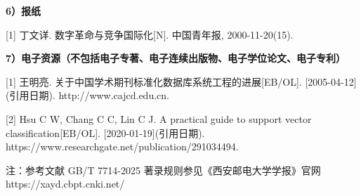 {\bfseries 6）报纸}\par
{[1]} 丁文详. 数字革命与竞争国际化[N]. 中国青年报, 2000-11-20(15).\par

{\bfseries 7）电子资源（不包括电子专著、电子连续出版物、电子学位论文、电子专利）}\par
{[1]} 王明亮. 关于中国学术期刊标准化数据库系统工程的进展[EB/OL]. [2005-04-12](引用日期). http://www.cajcd.edu.cn.\par
{[2]} Hsu C W, Chang C C, Lin C J. A practical guide to support vector classification[EB/OL]. [2020-01-19](引用日期). https://www.researchgate.net/publication/291034494.\par

\endgroup

\par
注：参考文献 GB/T 7714-2025 著录规则参见《西安邮电大学学报》官网
https://xayd.cbpt.cnki.net/
